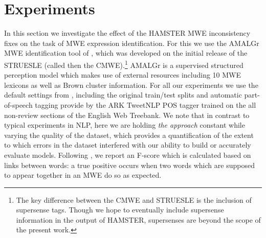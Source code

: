 \documentclass[output=paper
,modfonts
,nonflat]{langsci/langscibook}
\begin{document}

\section{Experiments}

In this section we investigate the effect of the HAMSTER MWE inconsistency fixes on the task of MWE expression identification. For this we use the AMALGr MWE identification tool of \citet{Schneider14b}, which was developed on the initial release of the STRUESLE (called then the CMWE).\footnote{The key difference between the CMWE and STRUESLE is the inclusion of supersense tags. Though we hope to eventually include supersense information in the output of HAMSTER, supersenses are beyond the scope of the present work.} AMALGr is a supervised structured perception model which makes use of external resources including 10 MWE lexicons as well as Brown cluster information. For all our experiments we use the default settings from \citet{Schneider14b}, including the original train/test splits and automatic part-of-speech tagging provide by the ARK TweetNLP POS tagger \citep{Owoputi13} trained on the all non-review sections of the English Web Treebank. We note that in contrast to typical experiments in NLP, here we are holding \textit{the approach} constant while varying the quality of the dataset, which provides a quantification of the extent to which errors in the dataset interfered with our ability to build or accurately evaluate models. Following \citet{Schneider14b}, we report an F-score which is calculated based on links between words: a true positive occurs when two words which are supposed to appear together in an MWE do so as expected.
\end{document}
